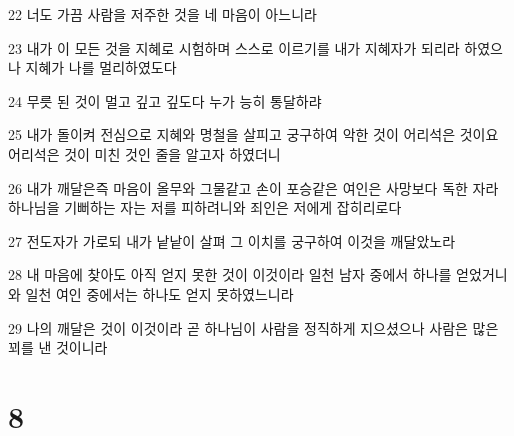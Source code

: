 \par 22 너도 가끔 사람을 저주한 것을 네 마음이 아느니라
\par 23 내가 이 모든 것을 지혜로 시험하며 스스로 이르기를 내가 지혜자가 되리라 하였으나 지혜가 나를 멀리하였도다
\par 24 무릇 된 것이 멀고 깊고 깊도다 누가 능히 통달하랴
\par 25 내가 돌이켜 전심으로 지혜와 명철을 살피고 궁구하여 악한 것이 어리석은 것이요 어리석은 것이 미친 것인 줄을 알고자 하였더니
\par 26 내가 깨달은즉 마음이 올무와 그물같고 손이 포승같은 여인은 사망보다 독한 자라 하나님을 기뻐하는 자는 저를 피하려니와 죄인은 저에게 잡히리로다
\par 27 전도자가 가로되 내가 낱낱이 살펴 그 이치를 궁구하여 이것을 깨달았노라
\par 28 내 마음에 찾아도 아직 얻지 못한 것이 이것이라 일천 남자 중에서 하나를 얻었거니와 일천 여인 중에서는 하나도 얻지 못하였느니라
\par 29 나의 깨달은 것이 이것이라 곧 하나님이 사람을 정직하게 지으셨으나 사람은 많은 꾀를 낸 것이니라

\chapter{8}

